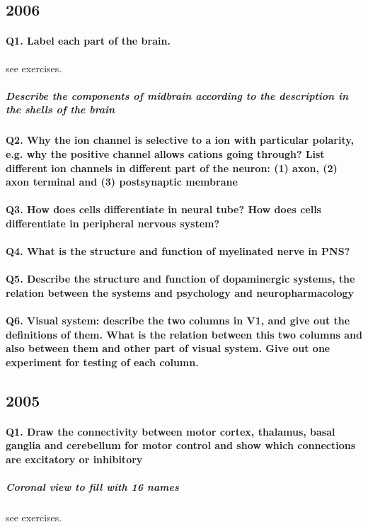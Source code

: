\documentclass[12pt,article,oneside,a4paper]{memoir}
\begin{document}
\subsection{2006}
\paragraph{Q1. Label each part of the brain.} see exercises.
\subparagraph{Describe the components of midbrain according to the description in the shells of the brain}
\paragraph{Q2. Why the ion channel is selective to a ion with particular polarity, e.g. why the positive channel allows cations going through? List different ion channels in different part of the neuron: (1) axon, (2) axon terminal and (3) postsynaptic membrane}
\paragraph{Q3. How does cells differentiate in neural tube? How does cells differentiate in peripheral nervous system?}
\paragraph{Q4. What is the structure and function of myelinated nerve in PNS?}
\paragraph{Q5. Describe the structure and function of dopaminergic systems, the relation between the systems and psychology and neuropharmacology}
\paragraph{Q6. Visual system: describe the two columns in V1, and give out the definitions of them. What is the relation between this two columns and also between them and other part of visual system. Give out one experiment for testing of each column.}


\subsection{2005}
\paragraph{Q1. Draw the connectivity between motor cortex, thalamus, basal ganglia and cerebellum for motor control and show which connections are excitatory or inhibitory}
\subparagraph{Coronal view to fill with 16 names} see exercises.
\end{document}
